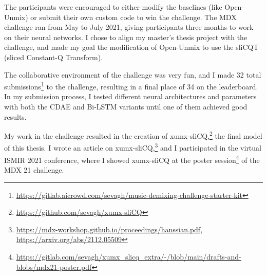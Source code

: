 \documentclass[report.tex]{subfiles}
\begin{document}
\begin{appendices}
The participants were encouraged to either modify the baselines (like Open-Unmix) or submit their own custom code to win the challenge. The MDX challenge ran from May to July 2021, giving participants three months to work on their neural networks. I chose to align my master's thesis project with the challenge, and made my goal the modification of Open-Unmix to use the sliCQT (sliced Constant-Q Transform).

The collaborative environment of the challenge was very fun, and I made 32 total submissions\footnote{\url{https://gitlab.aicrowd.com/sevagh/music-demixing-challenge-starter-kit}} to the challenge, resulting in a final place of 34 on the leaderboard. In my submission process, I tested different neural architectures and parameters with both the CDAE and Bi-LSTM variants until one of them achieved good results.

My work in the challenge resulted in the creation of xumx-sliCQ,\footnote{\url{https://github.com/sevagh/xumx-sliCQ}} the final model of this thesis. I wrote an article on xumx-sliCQ,\footnote{\url{https://mdx-workshop.github.io/proceedings/hanssian.pdf}, \url{https://arxiv.org/abs/2112.05509}} and I participated in the virtual ISMIR 2021 conference, where I showed xumx-sliCQ at the poster session\footnote{\url{https://gitlab.com/sevagh/xumx_slicq_extra/-/blob/main/drafts-and-blobs/mdx21-poster.pdf}} of the MDX 21 challenge.

\end{appendices}
\end{document}
